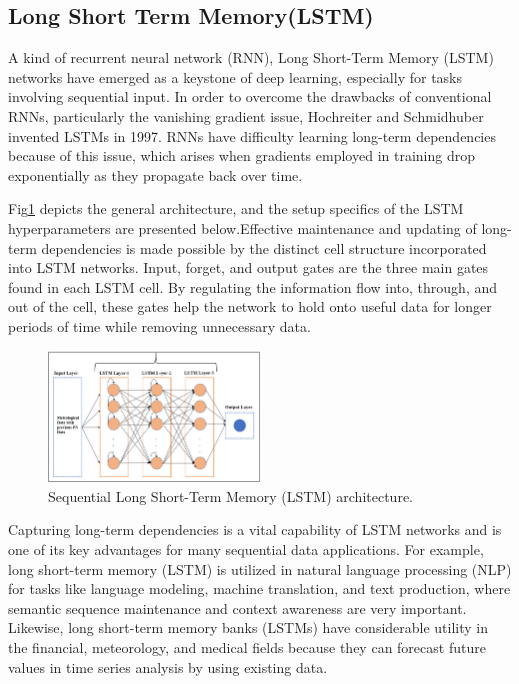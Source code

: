 \documentclass[conference]{IEEEtran}
\begin{document}
\subsection{Long Short Term Memory(LSTM)}

A kind of recurrent neural network (RNN), Long Short-Term Memory (LSTM) networks have emerged as a keystone of deep learning, especially for tasks involving sequential input. In order to overcome the drawbacks of conventional RNNs, particularly the vanishing gradient issue, Hochreiter and Schmidhuber invented LSTMs in 1997. \cite{dipietro2020deep} RNNs have difficulty learning long-term dependencies because of this issue, which arises when gradients employed in training drop exponentially as they propagate back over time.

Fig\ref{fig:LSTM} depicts the general architecture, and the setup specifics of the LSTM hyperparameters are presented below.Effective maintenance and updating of long-term dependencies is made possible by the distinct cell structure incorporated into LSTM networks. Input, forget, and output gates are the three main gates found in each LSTM cell.\cite{kawakami2008supervised} By regulating the information flow into, through, and out of the cell, these gates help the network to hold onto useful data for longer periods of time while removing unnecessary data.

\begin{figure}[htbp]
\centerline{\includegraphics[width=0.5\textwidth]{Images/LSTM.jpg}}
\caption{Sequential Long Short-Term Memory (LSTM) architecture. \cite{LSTM}}
\label{fig:LSTM}
\end{figure}

Capturing long-term dependencies is a vital capability of LSTM networks and is one of its key advantages for many sequential data applications. For example, long short-term memory (LSTM) is utilized in natural language processing (NLP) for tasks like language modeling, machine translation, and text production, where semantic sequence maintenance and context awareness are very important.\cite{dipietro2020deep} Likewise, long short-term memory banks (LSTMs) have considerable utility in the financial, meteorology, and medical fields because they can forecast future values in time series analysis by using existing data. \cite{lstmarticle}
\end{document}
